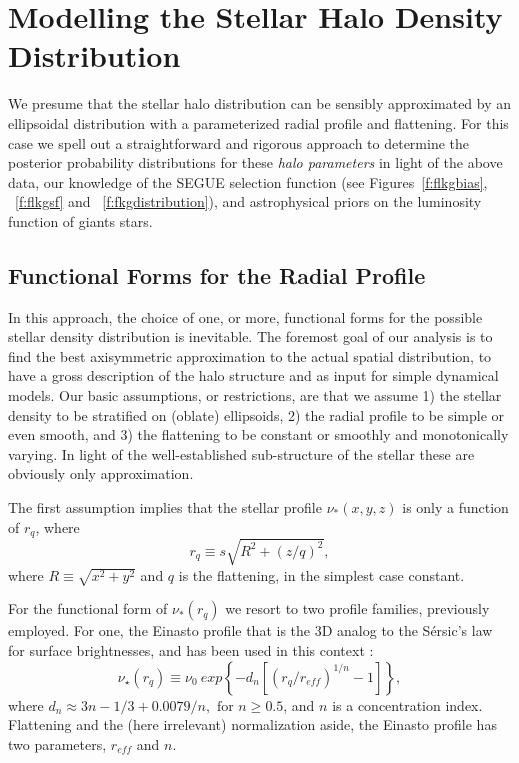 \documentclass[12pt,preprint]{aastex}
\begin{document}
\section{Modelling the Stellar Halo Density Distribution}

We presume that the stellar halo distribution can be sensibly approximated by an ellipsoidal distribution with a parameterized radial profile and flattening. For this case we spell out a straightforward and rigorous approach to determine the posterior probability distributions for these \textit{halo parameters} in light of the above data, our knowledge of the SEGUE selection function (see Figures~\ref{f:flkgbias}, ~\ref{f:flkgsf} and ~\ref{f:fkgdistribution}), and astrophysical priors on the luminosity function of giants stars. 

\subsection{Functional Forms for the Radial Profile}

In this approach, the choice of one, or more, functional forms for the possible stellar density distribution is inevitable. The foremost goal of our analysis is to find the best axisymmetric approximation to the actual spatial distribution, to have a gross description of the halo structure and as input for simple dynamical models. Our basic assumptions, or restrictions, are that we assume 1) the stellar density to be stratified on (oblate) ellipsoids, 2) the radial profile to be simple or even smooth, and 3) the flattening to be constant or smoothly and monotonically varying. In light of the well-established sub-structure of the stellar these are obviously only approximation. 

The first assumption implies that the stellar profile $\nu_*(x,y,z)$ is only a function of $r_q$,
where 
\begin{equation}
r_q\equiv s\sqrt{R^2 + (z/q)^2},
\end{equation}
where $R\equiv \sqrt{x^2+y^2}$ and $q$ is the flattening, in the simplest case constant.

For the functional form of $\nu_*(r_q)$ we resort to two profile families, previously employed.
For one, the Einasto profile \citep{Einasto1989} that is the 3D analog to the S{\'e}rsic's law\citep{Sersic1963} for surface brightnesses, and has been used in this context \citep{Sesar2011,Deason2011,Merritt2006} :
\begin{equation}
\nu_{\star}(r_q) \equiv \nu_0~exp\left\{-d_n\left[\left(r_q/r_{eff}\right )^{1/n}-1\right ]\right\},
\end{equation}
where $ d_n \approx 3n-1/3+0.0079/n, \mbox{ for } n \ge 0.5 \nonumber$,
and $n$ is a concentration index. Flattening and the (here irrelevant) normalization aside, the Einasto profile has two parameters, $r_{eff}$ and $n$.
\end{document}
